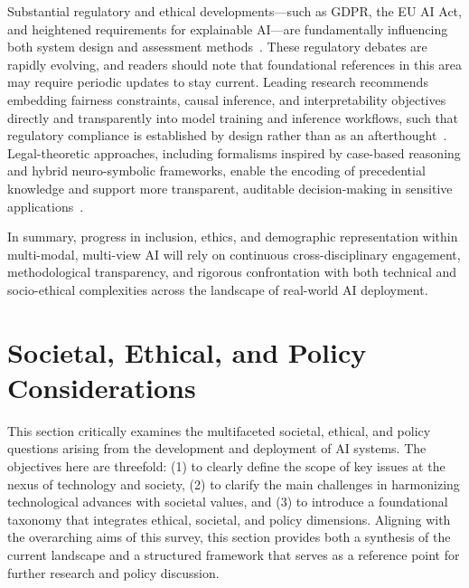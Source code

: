 \documentclass[sigconf]{acmart}
\begin{document}
Substantial regulatory and ethical developments—such as GDPR, the EU AI Act, and heightened requirements for explainable AI—are fundamentally influencing both system design and assessment methods~\cite{ref42,ref49,ref65}. These regulatory debates are rapidly evolving, and readers should note that foundational references in this area may require periodic updates to stay current. Leading research recommends embedding fairness constraints, causal inference, and interpretability objectives directly and transparently into model training and inference workflows, such that regulatory compliance is established by design rather than as an afterthought~\cite{ref10,ref44,ref49,ref52,ref65}. Legal-theoretic approaches, including formalisms inspired by case-based reasoning and hybrid neuro-symbolic frameworks, enable the encoding of precedential knowledge and support more transparent, auditable decision-making in sensitive applications~\cite{ref46,ref49,ref50,ref53}.

In summary, progress in inclusion, ethics, and demographic representation within multi-modal, multi-view AI will rely on continuous cross-disciplinary engagement, methodological transparency, and rigorous confrontation with both technical and socio-ethical complexities across the landscape of real-world AI deployment.

\section{Societal, Ethical, and Policy Considerations}
This section critically examines the multifaceted societal, ethical, and policy questions arising from the development and deployment of AI systems. The objectives here are threefold: (1) to clearly define the scope of key issues at the nexus of technology and society, (2) to clarify the main challenges in harmonizing technological advances with societal values, and (3) to introduce a foundational taxonomy that integrates ethical, societal, and policy dimensions. Aligning with the overarching aims of this survey, this section provides both a synthesis of the current landscape and a structured framework that serves as a reference point for further research and policy discussion.
\end{document}
